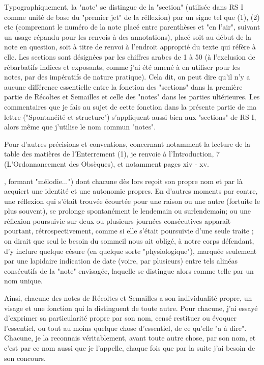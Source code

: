 {Typographiquement, la "note" se distingue de la "section" (utilisée dans RS I comme unité de base du "premier jet" de la réflexion) par un signe tel que (1), (2) etc (comprenant le numéro de la note placé entre parenthèses et "en l'air", suivant un usage répandu pour les renvois à des annotations), placé soit au début de la note en question, soit à titre de renvoi à l'endroit approprié du texte qui réfère à elle. Les sections sont désignées par les chiffres arabes de 1 à 50 (à l'exclusion de rébarbatifs indices et exposants, comme j'ai été amené à en utiliser pour les notes, par des impératifs de nature pratique). Cela dit, on peut dire qu'il n'y a aucune différence essentielle entre la fonction des "sections" dans la première partie de Récoltes et Semailles et celle des "notes" dans les parties ultérieures. Les commentaires que je fais au sujet de cette fonction dans la présente partie de ma lettre ("Spontanéité et structure") s'appliquent aussi bien aux "sections" de RS I, alors même que j'utilise le nom commun "notes".

Pour d'autres précisions et conventions, concernant notamment la lecture de la table des matières de l'Enterrement (1), je renvoie à l'Introduction, 7 (L'Ordonnancement des Obsèques), et notamment pages xiv - xv.}, formant "mélodie...") dont chacune dès lors reçoit son propre nom et par là acquiert une identité et une autonomie propres. En d'autres moments par contre, une réflexion qui s'était trouvée écourtée pour une raison ou une autre (fortuite le plus souvent), se prolonge spontanément le lendemain ou surlendemain; ou une réflexion poursuivie sur deux ou plusieurs journées consécutives apparaît pourtant, rétrospectivement, comme si elle s'était poursuivie d'une seule traite ; on dirait que seul le besoin du sommeil nous ait obligé, à notre corps défendant, d'y inclure quelque césure (en quelque sorte "physiologique"), marquée seulement par une lapidaire indication de date (voire, par plusieurs) entre tels alinéas consécutifs de la "note" envisagée, laquelle se distingue alors comme telle par un nom unique.

Ainsi, chacune des notes de Récoltes et Semailles a son individualité propre, un visage et une fonction qui la distinguent de toute autre. Pour chacune, j'ai essayé d'exprimer sa particularité propre par son nom, censé restituer ou évoquer l'essentiel, ou tout au moins quelque chose d'essentiel, de ce qu'elle "a à dire". Chacune, je la reconnais véritablement, avant toute autre chose, par son nom, et c'est par ce nom aussi que je l'appelle, chaque fois que par la suite j'ai besoin de son concours.

